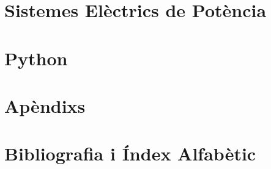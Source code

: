 \documentclass[catalan,a4paper,twoside,11pt]{book}
\begin{document}
   \part{Sistemes Elèctrics de Potència}
      \thispagestyle{empty}
      \BgThispage
      
      
      
   \part{Python}
      \thispagestyle{empty}
      \BgThispage
      
      
      
   \part{Apèndixs}
      \thispagestyle{empty}
      \BgThispage
      \appendix
      \renewcommand*{\chaptername}{\appendixname}
      
      
      
      
      
      
   \part{Bibliografia i  Índex Alfabètic}
      \thispagestyle{empty}
      \BgThispage
      \backmatter
      
      \printindex
 
\end{document}
